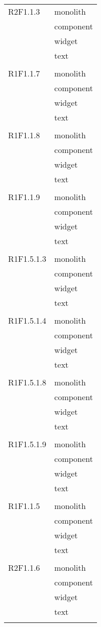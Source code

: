 \begin{center}
\begin{longtable}{|p{7cm}|p{5cm}|}
		R2F1.1.3 & monolith \\ & component \\ & widget \\ & text \\ & \\ \hline
		R1F1.1.7 & monolith \\ & component \\ & widget \\ & text \\ & \\ \hline
		R1F1.1.8 & monolith \\ & component \\ & widget \\ & text \\ & \\ \hline
		R1F1.1.9 & monolith \\ & component \\ & widget \\ & text \\ & \\ \hline
		R1F1.5.1.3 & monolith \\ & component \\ & widget \\ & text \\ & \\ \hline
		R1F1.5.1.4 & monolith \\ & component \\ & widget \\ & text \\ & \\ \hline
		R1F1.5.1.8 & monolith \\ & component \\ & widget \\ & text \\ & \\ \hline
		R1F1.5.1.9 & monolith \\ & component \\ & widget \\ & text \\ & \\ \hline
		R1F1.1.5 & monolith \\ & component \\ & widget \\ & text \\ & \\ \hline
		R2F1.1.6 & monolith \\ & component \\ & widget \\ & text \\ & \\ \hline

\end{longtable}
\end{center}
